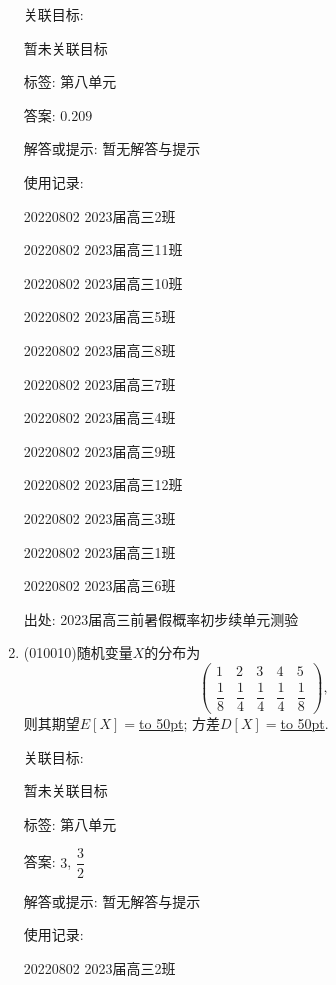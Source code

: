 \documentclass[10pt,a4paper]{article}
\newcommand{\blank}[1]{\underline{\hbox to #1pt{}}}
\begin{document}
\begin{enumerate}[1.]
关联目标:

暂未关联目标



标签: 第八单元

答案: $0.209$

解答或提示: 暂无解答与提示

使用记录:

20220802	2023届高三2班	

20220802	2023届高三11班	

20220802	2023届高三10班	

20220802	2023届高三5班	

20220802	2023届高三8班	

20220802	2023届高三7班	

20220802	2023届高三4班	

20220802	2023届高三9班	

20220802	2023届高三12班	

20220802	2023届高三3班	

20220802	2023届高三1班	

20220802	2023届高三6班	


出处: 2023届高三前暑假概率初步续单元测验
\item { (010010)}随机变量$X$的分布为
\[\begin{pmatrix} 1 & 2 & 3 & 4 & 5 \\ \dfrac 18 & \dfrac 14 & \dfrac 14 & \dfrac 14 & \dfrac 18\end{pmatrix},\]
则其期望$E[X]=$\blank{50}; 方差$D[X]=$\blank{50}.


关联目标:

暂未关联目标



标签: 第八单元

答案: $3$, $\dfrac 32$

解答或提示: 暂无解答与提示

使用记录:

20220802	2023届高三2班		


\end{enumerate}
\end{document}
